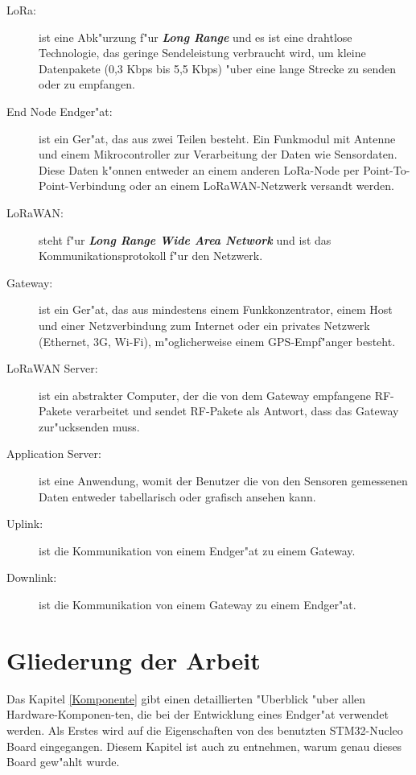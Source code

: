 \begin{description}
	\newpage
	\item[LoRa:] ist eine Abk"urzung f"ur 
	\textbf{\textit{Long Range}} 
	und es ist eine drahtlose Technologie, das geringe 
	Sendeleistung 
	verbraucht wird, um kleine Datenpakete (0,3 \ac{Kbps} 
	bis 5,5 Kbps) "uber 
	eine lange Strecke zu senden oder zu empfangen.    
	
	\item[End Node Endger"at:] ist ein Ger"at, das aus 
	zwei Teilen 
	besteht. Ein Funkmodul mit Antenne und einem 
	Mikrocontroller zur 
	Verarbeitung der Daten wie Sensordaten. Diese Daten 
	k"onnen entweder 
	an einem anderen LoRa-Node per 
	Point-To-Point-Verbindung oder an 
	einem LoRaWAN-Netzwerk versandt werden.

	\item[LoRaWAN:] steht f"ur \textbf{\textit{Long 
	Range Wide Area 
	Network}} und ist das Kommunikationsprotokoll f"ur 
	den Netzwerk.
	
	\item[Gateway:] ist ein Ger"at, das aus mindestens 
	einem 
	Funkkonzentrator, einem Host und einer 
	Netzverbindung zum Internet 
	oder ein privates Netzwerk (Ethernet, 3G, Wi-Fi), 
	m"oglicherweise 
	einem \ac{GPS}-Empf"anger besteht.
	
	\item[LoRaWAN Server:] ist ein abstrakter Computer, 
	der die von dem 
	Gateway empfangene RF-Pakete verarbeitet und sendet 
	RF-Pakete als 
	Antwort, dass das Gateway zur"ucksenden muss.
	\vspace{1cm}
	\item[Application Server:] ist eine Anwendung, 
	womit der Benutzer 
	die von den Sensoren gemessenen Daten entweder 
    tabellarisch oder 
	grafisch ansehen kann.
	
	\item[Uplink:] ist die Kommunikation von einem 
	Endger"at zu einem 
	Gateway. 
	
	\item[Downlink:] ist die Kommunikation von einem 
	Gateway zu einem 
	Endger"at.
\end{description}


\section{Gliederung der Arbeit}

Das Kapitel \ref{Komponente} gibt einen detaillierten 
"Uberblick "uber allen Hardware-Komponen-ten, die bei 
der Entwicklung eines Endger"at verwendet werden. Als 
Erstes wird auf die Eigenschaften von des benutzten 
STM32-Nucleo Board eingegangen. Diesem Kapitel ist auch 
zu entnehmen, warum genau dieses Board gew"ahlt wurde. 

